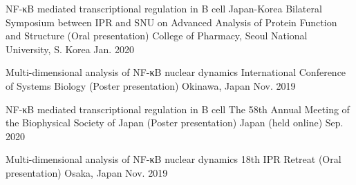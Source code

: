 

\begin{cventries}

  \cvpres
    {NF-κB mediated transcriptional regulation in B cell} %
    {Japan-Korea Bilateral Symposium between IPR and SNU on Advanced Analysis of Protein Function and Structure (Oral presentation)} %
    {College of Pharmacy, Seoul National University, S. Korea} %
    {Jan. 2020} %


  \cvpres
    {Multi-dimensional analysis of NF-κB nuclear dynamics} %
    {International Conference of Systems Biology (Poster presentation)} %
    {Okinawa, Japan} %
    {Nov. 2019} %


\end{cventries}


\begin{cventries}

  \cvpres
    {NF-κB mediated transcriptional regulation in B cell} %
    {The 58th Annual Meeting of the Biophysical Society of Japan (Poster presentation)} %
    {Japan (held online)} %
    {Sep. 2020} %


  \cvpres
    {Multi-dimensional analysis of NF-κB nuclear dynamics} %
    {18th IPR Retreat (Oral presentation)} %
    {Osaka, Japan} %
    {Nov. 2019} %

  \cvpres
  { 　} %
  {　　 } %
  {　　 } %
  {　　 } %
  \cvpres
  { 　} %
  {　　 } %
  {　　 } %
  {　　 } %
  \cvpres
  { 　} %
  {　　 } %
  {　　 } %
  {　　 } %
\end{cventries}